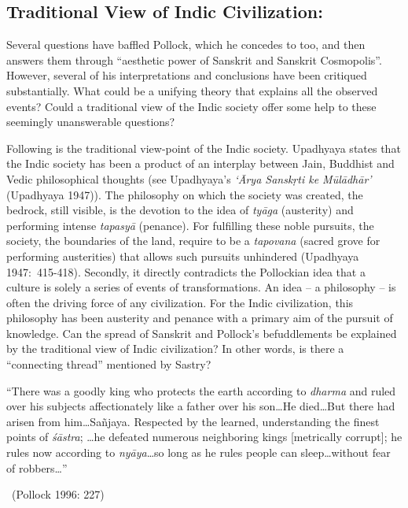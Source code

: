 \subsection*{Traditional View of Indic Civilization:}

Several questions have baffled Pollock, which he concedes to too, and then answers them through “aesthetic power of Sanskrit and Sanskrit Cosmopolis”. However, several of his interpretations and conclusions have been critiqued substantially. What could be a unifying theory that explains all the observed events? Could a traditional view of the Indic society offer some help to these seemingly unanswerable questions?

Following is the traditional view-point of the Indic society. Upadhyaya states that the Indic society has been a product of an interplay between Jain, Buddhist and Vedic philosophical thoughts (see Upadhyaya’s \textit{‘Ārya Sanskṛti ke Mūlādhār’} (Upadhyaya 1947)). The philosophy on which the society was created, the bedrock, still visible, is the devotion to the idea of \textit{tyāga} (austerity) and performing intense \textit{tapasyā} (penance). For fulfilling these noble pursuits, the society, the boundaries of the land, require to be a \textit{tapovana} (sacred grove for performing austerities) that allows such pursuits unhindered (Upadhyaya 1947:~415-418). Secondly, it directly contradicts the Pollockian idea that a culture is solely a series of events of transformations. An idea – a philosophy – is often the driving force of any civilization. For the Indic civilization, this philosophy has been austerity and penance with a primary aim of the pursuit of knowledge. Can the spread of Sanskrit and Pollock’s befuddlements be explained by the traditional view of Indic civilization? In other words, is there a “connecting thread” mentioned by Sastry?

\begin{myquote}
“There was a goodly king who protects the earth according to \textit{dharma} and ruled over his subjects affectionately like a father over his son…He died…But there had arisen from him…Sañjaya. Respected by the learned, understanding the finest points of \textit{śāstra}; …he defeated numerous neighboring kings [metrically corrupt]; he rules now according to \textit{nyāya}…so long as he rules people can sleep…without fear of robbers…” 

~\hfill (Pollock 1996: 227)
\end{myquote}

